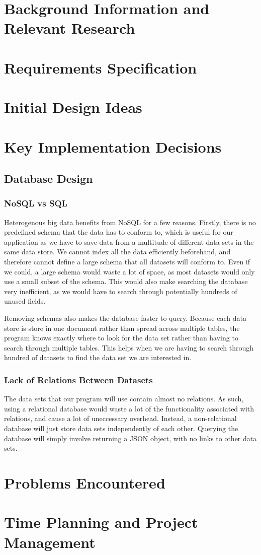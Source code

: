 \documentclass[titlepage]{article}
\begin{document}
\section{Background Information and \\Relevant Research}

\section{Requirements Specification}

\section{Initial Design Ideas}

\section{Key Implementation Decisions}
\subsection{Database Design}

\subsubsection{NoSQL vs SQL}
Heterogenous big data benefits from NoSQL for a few reasons. Firstly, there is no predefined schema that the data has to conform to, which is useful for our application as we have to save data from a multitude of different data sets in the same data store. We cannot index all the data efficiently beforehand, and therefore cannot define a large schema that all datasets will conform to. Even if we could, a large schema would waste a lot of space, as most datasets would only use a small subset of the schema. This would also make searching the database very inefficient, as we would have to search through potentially hundreds of unused fields.

Removing schemas also makes the database faster to query\cite{sqlvsnosql}. Because each data store is store in one document rather than spread across multiple tables, the program knows exactly where to look for the data set rather than having to search through multiple tables. This helps when we are having to search through hundred of datasets to find the data set we are interested in.

\subsubsection{Lack of Relations Between Datasets}
The data sets that our program will use contain almost no relations. As such, using a relational database would waste a lot of the functionality associated with relations, and cause a lot of uneccessary overhead. Instead, a non-relational database will just store data sets independently of each other. Querying the database will simply involve returning a JSON object, with no links to other data sets.
\section{Problems Encountered}

\section{Time Planning and Project Management}

\pagebreak
{}
 
\end{document}
